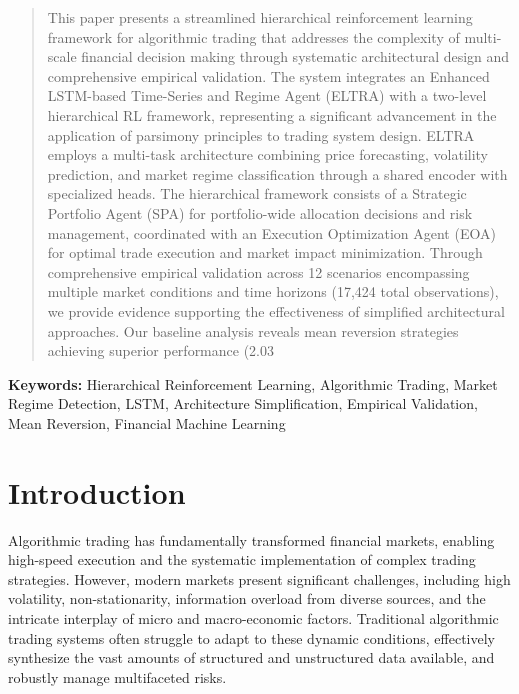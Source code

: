 \documentclass[11pt,a4paper]{article}
\begin{document}
\maketitle

\begin{abstract}
This paper presents a streamlined hierarchical reinforcement learning framework for algorithmic trading that addresses the complexity of multi-scale financial decision making through systematic architectural design and comprehensive empirical validation. The system integrates an Enhanced LSTM-based Time-Series and Regime Agent (ELTRA) with a two-level hierarchical RL framework, representing a significant advancement in the application of parsimony principles to trading system design. ELTRA employs a multi-task architecture combining price forecasting, volatility prediction, and market regime classification through a shared encoder with specialized heads. The hierarchical framework consists of a Strategic Portfolio Agent (SPA) for portfolio-wide allocation decisions and risk management, coordinated with an Execution Optimization Agent (EOA) for optimal trade execution and market impact minimization. Through comprehensive empirical validation across 12 scenarios encompassing multiple market conditions and time horizons (17,424 total observations), we provide evidence supporting the effectiveness of simplified architectural approaches. Our baseline analysis reveals mean reversion strategies achieving superior performance (2.03%
\end{abstract}

\textbf{Keywords:} Hierarchical Reinforcement Learning, Algorithmic Trading, Market Regime Detection, LSTM, Architecture Simplification, Empirical Validation, Mean Reversion, Financial Machine Learning


\section{Introduction}

Algorithmic trading has fundamentally transformed financial markets, enabling high-speed execution and the systematic implementation of complex trading strategies. However, modern markets present significant challenges, including high volatility, non-stationarity, information overload from diverse sources, and the intricate interplay of micro and macro-economic factors. Traditional algorithmic trading systems often struggle to adapt to these dynamic conditions, effectively synthesize the vast amounts of structured and unstructured data available, and robustly manage multifaceted risks.
\end{document}
